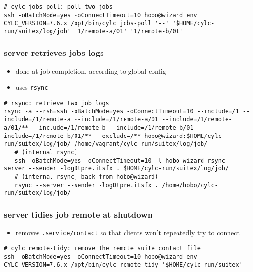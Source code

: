 \vspace{5mm}
    \begin{lstlisting}
# cylc jobs-poll: poll two jobs
ssh -oBatchMode=yes -oConnectTimeout=10 hobo@wizard env CYLC_VERSION=7.6.x /opt/bin/cylc jobs-poll '--' '$HOME/cylc-run/suitex/log/job' '1/remote-a/01' '1/remote-b/01'
    \end{lstlisting}


\subsubsection{server retrieves jobs logs}

\begin{itemize}
  \item done at job completion, according to global config
  \item uses \lstinline=rsync=
\end{itemize}

\vspace{5mm}
    \begin{lstlisting}
# rsync: retrieve two job logs
rsync -a --rsh=ssh -oBatchMode=yes -oConnectTimeout=10 --include=/1 --include=/1/remote-a --include=/1/remote-a/01 --include=/1/remote-a/01/** --include=/1/remote-b --include=/1/remote-b/01 --include=/1/remote-b/01/** --exclude=/** hobo@wizard:$HOME/cylc-run/suitex/log/job/ /home/vagrant/cylc-run/suitex/log/job/
   # (internal rsync)
   ssh -oBatchMode=yes -oConnectTimeout=10 -l hobo wizard rsync --server --sender -logDtpre.iLsfx . $HOME/cylc-run/suitex/log/job/
   # (internal rsync, back from hobo@wizard)
   rsync --server --sender -logDtpre.iLsfx . /home/hobo/cylc-run/suitex/log/job/
    \end{lstlisting}

\subsubsection{server tidies job remote at shutdown}

\begin{itemize}
  \item removes \lstinline=.service/contact= so that clients won't repeatedly
    try to connect
\end{itemize}

\vspace{5mm}
    \begin{lstlisting}
# cylc remote-tidy: remove the remote suite contact file
ssh -oBatchMode=yes -oConnectTimeout=10 hobo@wizard env CYLC_VERSION=7.6.x /opt/bin/cylc remote-tidy '$HOME/cylc-run/suitex'
    \end{lstlisting}

